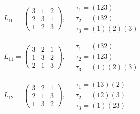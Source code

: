 $L_{10} = \begin{pmatrix} 3 & 1 & 2 \\ 2 & 3 & 1 \\ 1 & 2 & 3 \end{pmatrix}, \quad \begin{matrix} \tau_{1} = (1 2 3) \\ \tau_{2} = (1 3 2) \\ \tau_{3} = (1)(2)(3) \end{matrix}$

$L_{11} = \begin{pmatrix} 3 & 2 & 1 \\ 1 & 3 & 2 \\ 2 & 1 & 3 \end{pmatrix}, \quad \begin{matrix} \tau_{1} = (1 3 2) \\ \tau_{2} = (1 2 3) \\ \tau_{3} = (1)(2)(3) \end{matrix}$

$L_{12} = \begin{pmatrix} 3 & 2 & 1 \\ 2 & 1 & 3 \\ 1 & 3 & 2 \end{pmatrix}, \quad \begin{matrix} \tau_{1} = (1 3)(2) \\ \tau_{2} = (1 2)(3) \\ \tau_{3} = (1)(2 3) \end{matrix}$
